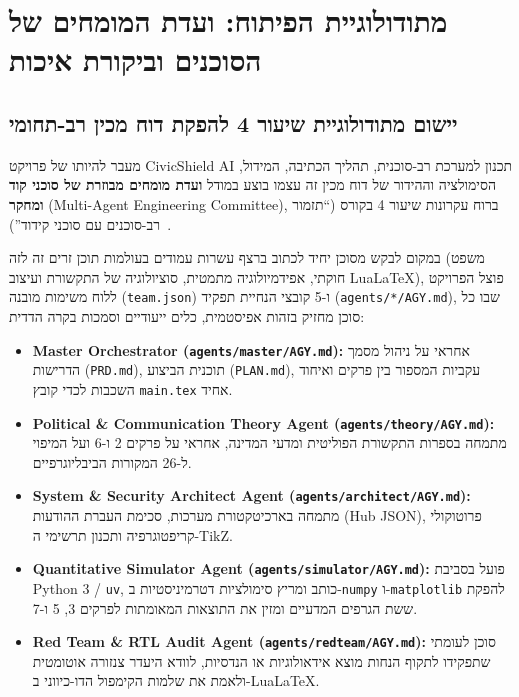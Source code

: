 \chapter{מתודולוגיית הפיתוח: ועדת המומחים של הסוכנים וביקורת איכות}
\label{ch:methodology}

\section{יישום מתודולוגיית שיעור 4 להפקת דוח מכין רב-תחומי}
\label{sec:lesson4-methodology}

מעבר להיותו של פרויקט CivicShield AI תכנון למערכת רב-סוכנית, תהליך הכתיבה, המידול, הסימולציה וההידור של דוח מכין זה עצמו בוצע במודל \textbf{ועדת מומחים מבוזרת של סוכני קוד ומחקר} (Multi-Agent Engineering Committee), ברוח עקרונות שיעור 4 בקורס (``תזמור רב-סוכנים עם סוכני קידוד'')~\cite{segal2026}.

במקום לבקש מסוכן יחיד לכתוב ברצף עשרות עמודים בעולמות תוכן זרים זה לזה (משפט חוקתי, אפידמיולוגיה מתמטית, סוציולוגיה של התקשורת ועיצוב LuaLaTeX), פוצל הפרויקט ללוח משימות מובנה (\texttt{team.json}) ו-5 קובצי הנחיית תפקיד (\texttt{agents/*/AGY.md}), שבו כל סוכן מחזיק בזהות אפיסטמית, כלים ייעודיים וסמכות בקרה הדדית:

\begin{itemize}
    \item \textbf{Master Orchestrator (\texttt{agents/master/AGY.md}):} אחראי על ניהול מסמך הדרישות (\texttt{PRD.md}), תוכנית הביצוע (\texttt{PLAN.md}), עקביות המספור בין פרקים ואיחוד השכבות לכדי קובץ \texttt{main.tex} אחיד.
    \item \textbf{Political \& Communication Theory Agent (\texttt{agents/theory/AGY.md}):} מתמחה בספרות התקשורת הפוליטית ומדעי המדינה, אחראי על פרקים 2 ו-6 ועל המיפוי ל-26 המקורות הביבליוגרפיים.
    \item \textbf{System \& Security Architect Agent (\texttt{agents/architect/AGY.md}):} מתמחה בארכיטקטורת מערכות, סכימת העברת ההודעות (Hub JSON), פרוטוקולי קריפטוגרפיה ותכנון תרשימי ה-TikZ.
    \item \textbf{Quantitative Simulator Agent (\texttt{agents/simulator/AGY.md}):} פועל בסביבת Python 3 / \texttt{uv}, כותב ומריץ סימולציות דטרמיניסטיות ב-\texttt{numpy} ו-\texttt{matplotlib} להפקת ששת הגרפים המדעיים ומזין את התוצאות המאומתות לפרקים 3, 5 ו-7.
    \item \textbf{Red Team \& RTL Audit Agent (\texttt{agents/redteam/AGY.md}):} סוכן לעומתי שתפקידו לתקוף הנחות מוצא אידאולוגיות או הנדסיות, לוודא היעדר צנזורה אוטומטית ולאמת את שלמות הקימפול הדו-כיווני ב-LuaLaTeX.
\end{itemize}

